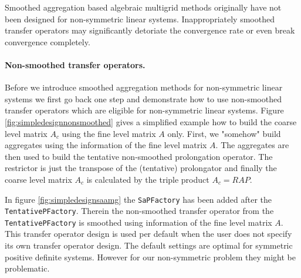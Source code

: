 \documentclass[12pt,a4paper]{article}
\begin{document}
Smoothed aggregation based algebraic multigrid methods originally have not been designed for non-symmetric linear systems. Inappropriately smoothed transfer operators may significantly detoriate the convergence rate or even break convergence completely.

\paragraph{Non-smoothed transfer operators.}
Before we introduce smoothed aggregation methods for non-symmetric linear systems we first go back one step and demonstrate how to use non-smoothed transfer operators which are eligible for non-symmetric linear systems. Figure \ref{fig:simpledesignnonsmoothed} gives a simplified example how to build the coarse level matrix $A_c$ using the fine level matrix $A$ only. First, we "somehow" build aggregates using the information of the fine level matrix $A$. The aggregates are then used to build the tentative non-smoothed prolongation operator. The restrictor is just the transpose of the (tentative) prolongator and finally the coarse level matrix $A_c$ is calculated by the triple product $A_c=RAP$.

In figure \ref{fig:simpledesignsaamg} the \verb|SaPFactory| has been added after the \verb|TentativePFactory|. Therein the non-smoothed transfer operator from the \verb|TentativePFactory| is smoothed using information of the fine level matrix $A$. This transfer operator design is used per default when the user does not specify its own transfer operator design. The default settings are optimal for symmetric positive definite systems. However for our non-symmetric problem they might be problematic.
\end{document}
